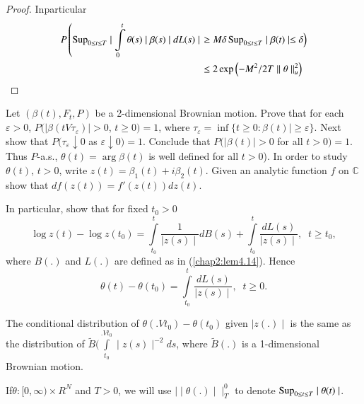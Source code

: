 \begin{proof}
 In\pageoriginale particular
 \begin{align*}
P \left( \operatorname{Sup}_{0 \leq t \leq T} \mid \int \limits^{t}_{0} \theta (s) \mid
\beta (s) \mid  dL (s) \mid  \right. & \left.\ge M \delta  \operatorname{Sup}_{0 \leq t \leq
  T}  \mid \beta (t) \mid \leq \delta \right) \\
&  \leq 2 \exp  \left( - M^2 /2 T \mid\mid \theta \mid\mid ^2_u \right)  
 \end{align*}
\end{proof}

 \setcounter{exercise}{15}
 \begin{exercise} %
Let $ ( \beta (t), F_t, P ) $ be a 2-dimensional Brownian
motion. Prove that for each $ \varepsilon > 0$, $P ( \mid \beta ( t V
\tau_\varepsilon ) \mid > 0$, $t \ge 0 ) = 1 $, where $
\tau_\varepsilon = \inf \{ t \ge 0 : \beta (t) \mid  \ge \varepsilon
\} $. Next show that $ P (\tau_\varepsilon \downarrow 0 $ as  $
\varepsilon \downarrow 0 ) = 1 $. Conclude that  $ P ( \mid \beta (t)
\mid > 0 $  for all $ t > 0 ) = 1 $. Thus $ P$-a.s., $ \theta (t) =
\arg \beta (t) $ is well defined for all $ t > 0$). In order to
study $ \theta (t)$,  $t > 0 $, write $ z (t) = \beta_1 (t) +
i \beta_2 (t)$. Given an analytic function $f$ on $ \mathbb{C}$ show
that $ df ( z (t)) =f' (z (t)) dz (t) $.  

In particular, show that for fixed $ t_0 > 0 $
$$
\log z (t)  - \log z (t_0) = \int \limits^{t}_{t_0} \frac{1}{\mid z
  (s) \mid } d B (s) + \int \limits^{t}_{t_0}  \frac{dL (s)}{\mid z
  (s) \mid }, \;\; t \ge t_0,   
$$
where  $B (.) $ and $L (.) $ are defined as  in (\ref{chap2:lem4.14}). Hence 
$$
\theta (t)  - \theta (t_0)  = \int \limits^{t}_{t_0}  \frac{dL
  (s)}{\mid z (s) \mid}, \;\; t \ge 0 . 
$$

The conditional distribution of 
$ \theta  (.V t_0) - \theta (t_0 ) $   given  $ \mid z (.) \mid $ is 
the same as the  distribution of  $ \tilde{B} ( \int\limits^{. V
  t_0}_{t_{0}} \mid z (s) \mid^{-2} ds $, where  $ \tilde{B} (.) $ is
a 1-dimensional Brownian motion. 
 \end{exercise}

\setcounter{notation}{16}
\begin{notation} %
 If\pageoriginale  $ \theta  : [ 0, \infty )   \times R^N $ and  $ T >
   0 $, we will use  $ \mid\mid \theta (.) \mid\mid^0_T $ to denote $
   \operatorname{Sup}\limits_{0 \leq t \leq T} \mid \theta (t) \mid $.  
\end{notation}

